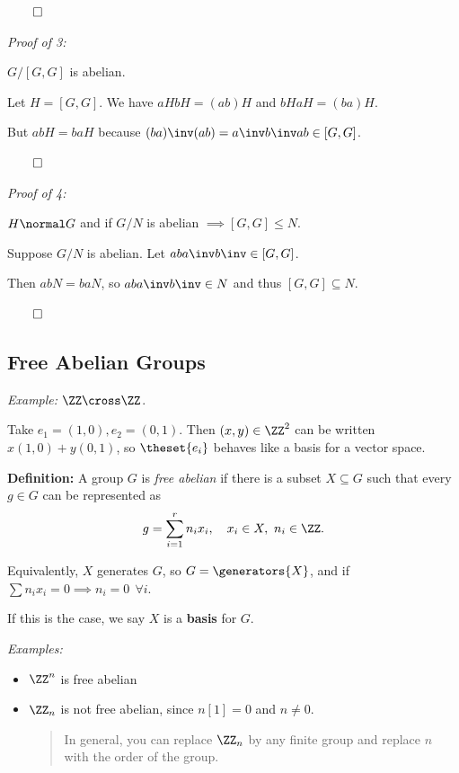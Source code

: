 \(\qed\)

\emph{Proof of 3:}

\(G/[G, G]\) is abelian.

Let \(H = [G, G]\). We have \(aH bH = (ab) H\) and \(bH aH = (ba)H\).

But \(abH = baH\) because \((ba)\inv(ab) = a\inv b\inv a b \in [G, G]\).

\(\qed\)

\emph{Proof of 4:}

\(H \normal G\) and if \(G/N\) is abelian \(\implies [G, G] \leq N\).

Suppose \(G/N\) is abelian. Let \(aba\inv b\inv \in [G, G]\).

Then \(abN = baN\), so \(aba\inv b\inv \in N\) and thus
\([G, G] \subseteq N\).

\(\qed\)

\hypertarget{free-abelian-groups}{%
\subsection{Free Abelian Groups}\label{free-abelian-groups}}

\emph{Example:} \(\ZZ \cross \ZZ\).

Take \(e_1 = (1, 0), e_2 = (0, 1)\). Then \((x,y) \in \ZZ^2\) can be
written \(x(1,0) + y(0, 1)\), so \(\theset{e_i}\) behaves like a basis
for a vector space.

\textbf{Definition:} A group \(G\) is \emph{free abelian} if there is a
subset \(X\subseteq G\) such that every \(g \in G\) can be represented
as
\begin{align*}
g = \sum_{i=1}^r n_i x_i,\quad x_i \in X,~n_i \in \ZZ.
\end{align*}

Equivalently, \(X\) generates \(G\), so \(G = \generators{X}\), and if
\(\sum n_i x_i = 0 \implies n_i = 0~~\forall i\).

If this is the case, we say \(X\) is a \textbf{basis} for \(G\).

\emph{Examples:}

\begin{itemize}
\item
  \(\ZZ^n\) is free abelian
\item
  \(\ZZ_n\) is not free abelian, since \(n [1] = 0\) and \(n\neq 0\).

  \begin{quote}
  In general, you can replace \(\ZZ_n\) by any finite group and replace
  \(n\) with the order of the group.
  \end{quote}
\end{itemize}

